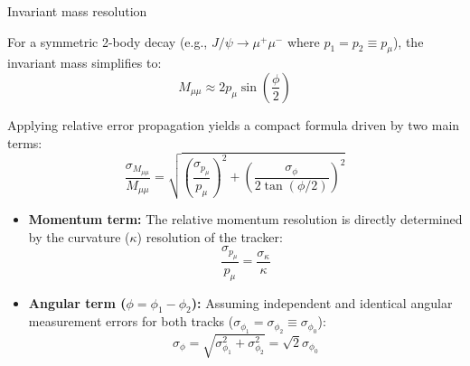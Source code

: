 \documentclass{beamer}
\begin{document}
\begin{frame}[noframenumbering]{Invariant mass resolution}
    
    \footnotesize
    
    For a symmetric 2-body decay (e.g., $J/\psi \to \mu^+\mu^-$ where $p_1 = p_2 \equiv p_\mu$), the invariant mass simplifies to:
    \begin{equation*}
        M_{\mu\mu} \approx 2 p_\mu \sin\left(\frac{\phi}{2}\right)
    \end{equation*}
    
    
    Applying relative error propagation yields a compact formula driven by two main terms:
    \begin{equation*}
        \frac{\sigma_{M_{\mu\mu}}}{M_{\mu\mu}} = \sqrt{ \left(\frac{\sigma_{p_\mu}}{p_\mu}\right)^2 + \left(\frac{\sigma_\phi}{2\tan(\phi/2)}\right)^2 }
    \end{equation*}
    
    
    \begin{itemize}
        \item \textbf{Momentum term:} The relative momentum resolution is directly determined by the curvature ($\kappa$) resolution of the tracker:
        \begin{equation*}
            \frac{\sigma_{p_\mu}}{p_\mu} = \frac{\sigma_\kappa}{\kappa}
        \end{equation*}
        
        \item \textbf{Angular term ($\phi = \phi_1 - \phi_2$):} Assuming independent and identical angular measurement errors for both tracks ($\sigma_{\phi_1} = \sigma_{\phi_2} \equiv \sigma_{\phi_0}$):
        \begin{equation*}
            \sigma_\phi = \sqrt{\sigma_{\phi_1}^2 + \sigma_{\phi_2}^2} = \sqrt{2}\sigma_{\phi_0}
        \end{equation*}
    \end{itemize}

\end{frame}
\end{document}
